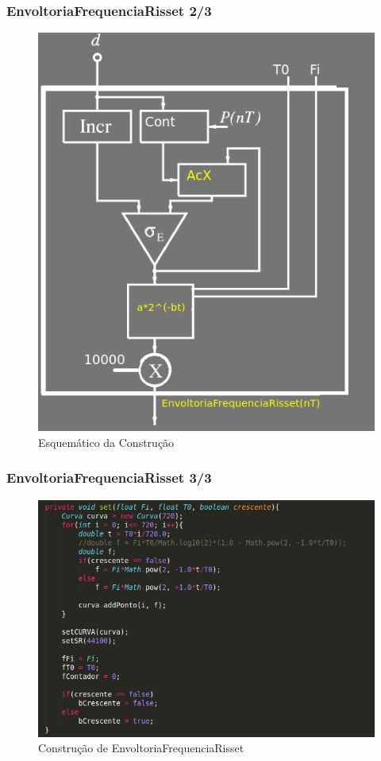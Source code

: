 \documentclass{beamer}
\begin{document}
\begin{frame}
 \frametitle{EnvoltoriaFrequenciaRisset 2/3}
 \begin{figure}
  \includegraphics[scale=0.4]{./images/freqRisset_esquema.png}
  \caption{Esquemático da Construção}
   \end{figure}
\end{frame}

\begin{frame}
 \frametitle{EnvoltoriaFrequenciaRisset 3/3}
 \begin{figure}
  \includegraphics[scale=0.4]{./images/freqRisset_code.png}
  \caption{Construção de EnvoltoriaFrequenciaRisset}
   \end{figure}
\end{frame}
\end{document}
